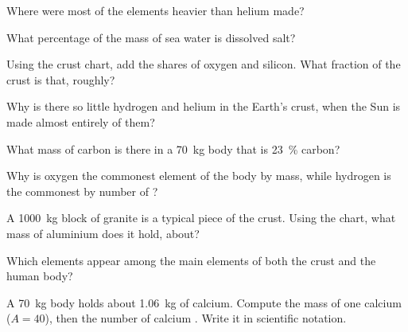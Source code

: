 \begin{exercise}[$\star$]\label{exo:g9:elements-universe-earth:3}
Where were most of the elements heavier than helium made?
\end{exercise}

\begin{exercise}[$\star$]\label{exo:g9:elements-universe-earth:4}
What percentage of the mass of sea water is dissolved salt?
\end{exercise}

\begin{exercise}[$\star\star$]\label{exo:g9:elements-universe-earth:5}
Using the crust chart, add the shares of oxygen and silicon. What
fraction of the crust is that, roughly?
\end{exercise}

\begin{exercise}[$\star\star$]\label{exo:g9:elements-universe-earth:6}
Why is there so little hydrogen and helium in the Earth's crust, when
the Sun is made almost entirely of them?
\end{exercise}

\begin{exercise}[$\star\star$]\label{exo:g9:elements-universe-earth:7}
What mass of carbon is there in a \qty{70}{kg} body that is
\qty{23}{\percent} carbon?
\end{exercise}

\begin{exercise}[$\star\star$]\label{exo:g9:elements-universe-earth:8}
Why is oxygen the commonest element of the body by mass, while hydrogen is
the commonest by number of ?
\end{exercise}

\begin{exercise}[$\star\star$]\label{exo:g9:elements-universe-earth:9}
A \qty{1000}{kg} block of granite is a typical piece of the crust. Using
the chart, what mass of aluminium does it hold, about?
\end{exercise}

\begin{exercise}[$\star\star$]\label{exo:g9:elements-universe-earth:10}
Which elements appear among the main elements of both the crust and the
human body?
\end{exercise}

\begin{exercise}[$\star\star\star$]\label{exo:g9:elements-universe-earth:11}
A \qty{70}{kg} body holds about \qty{1.06}{kg} of calcium. Compute the
mass of one calcium  ($A = 40$), then the number of calcium .
Write it in scientific notation.
\end{exercise}


